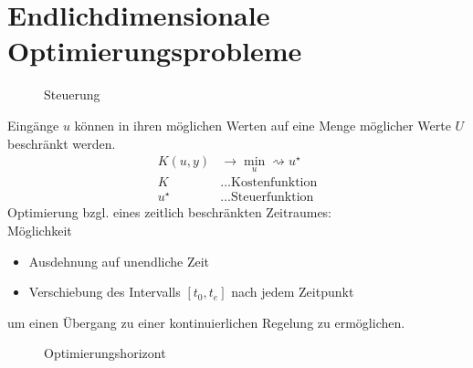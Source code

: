 \chapter{Endlichdimensionale Optimierungsprobleme}
\begin{figure}[htb]
	\centering
	
	\caption{Steuerung}
	\label{fig:kap_1_steuerung}
\end{figure}
Eingänge $u$ können in ihren möglichen Werten auf eine Menge möglicher Werte $U$ beschränkt werden.
\begin{align*}
K(u,y) & \rightarrow \min\limits_u\rightsquigarrow u^{\star}\\
K & \ldots \text{Kostenfunktion}\\
u^{\star} & \ldots \text{Steuerfunktion}
\end{align*}
Optimierung bzgl. eines zeitlich beschränkten Zeitraumes:\\
Möglichkeit
\begin{itemize}
  \item Ausdehnung auf unendliche Zeit
  \item Verschiebung des Intervalls $[t_0,t_e]$ nach jedem Zeitpunkt
\end{itemize}
um einen Übergang zu einer kontinuierlichen Regelung zu ermöglichen.
\begin{figure}[htb]
	\centering
	
	\caption{Optimierungshorizont}
	\label{fig:kap_1_horizont}
\end{figure}
